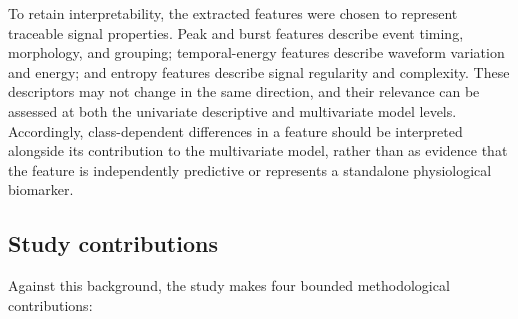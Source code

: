 \documentclass[10pt,letterpaper]{article}
\begin{document}
To retain interpretability, the extracted features were chosen to represent traceable signal properties. Peak and burst features describe event timing, morphology, and grouping; temporal-energy features describe waveform variation and energy; and entropy features describe signal regularity and complexity. These descriptors may not change in the same direction, and their relevance can be assessed at both the univariate descriptive and multivariate model levels. Accordingly, class-dependent differences in a feature should be interpreted alongside its contribution to the multivariate model, rather than as evidence that the feature is independently predictive or represents a standalone physiological biomarker.

\subsection*{Study contributions}

Against this background, the study makes four bounded methodological contributions:
\end{document}
